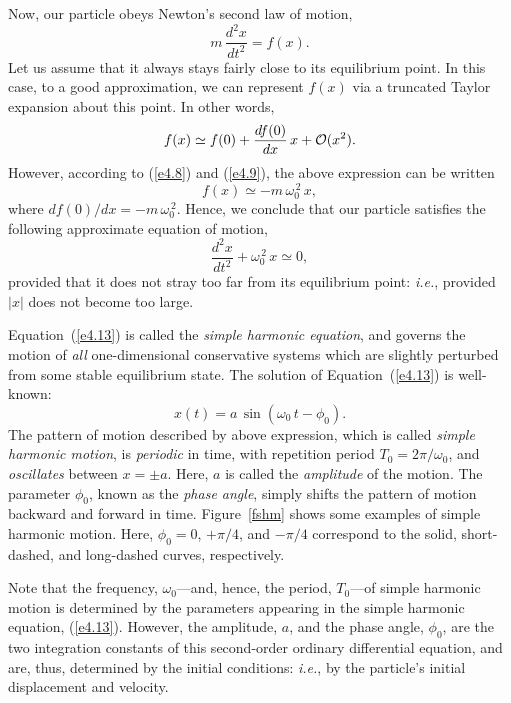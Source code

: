Now, our particle obeys Newton's second law of motion,
\begin{equation}
m\,\frac{d^2 x}{d t^2} = f(x).
\end{equation}
Let us assume that it always stays fairly close to its equilibrium
point. In this case, to a good approximation, we can represent $f(x)$
via a truncated Taylor expansion about this point. In other words,
\begin{equation}
f(x) \simeq f(0) + \frac{df(0)}{dx}\,x + {\cal O}(x^2).
\end{equation}
However, according to (\ref{e4.8}) and (\ref{e4.9}), the above
expression can be written
\begin{equation}\label{e4.12a}
f(x) \simeq - m\,\omega_0^{\,2}\,x,
\end{equation}
where $df(0)/dx = -m\,\omega_0^{\,2}$. 
Hence, we conclude that our particle satisfies the following approximate
equation of motion,
\begin{equation}\label{e4.13}
\frac{d^2 x}{dt^2}+ \omega_0^{\,2}\,x\simeq 0,
\end{equation}
provided that it does not stray too far from its equilibrium point: {\em i.e.},
provided $|x|$ does not become too large.

Equation~(\ref{e4.13}) is called the {\em simple harmonic equation}, and
governs the motion of {\em all}\/ one-dimensional conservative systems which are slightly
perturbed from some stable equilibrium state. The solution of Equation~(\ref{e4.13})
is well-known:
\begin{equation}\label{e4.12}
x(t) = a\,\sin(\omega_0\,t -\phi_0).
\end{equation}
The pattern of motion described by above expression, 
which is called {\em simple harmonic motion},
is {\em periodic}\/ in time, with repetition period
$T_0 = 2\pi/\omega_0$, and {\em oscillates}\/ between $x=\pm a$. Here, $a$
is called the {\em amplitude}\/ of the motion. The parameter $\phi_0$,
known as the {\em phase angle}, 
simply shifts the pattern of motion backward and forward in time. 
Figure~\ref{fshm} shows some examples of simple harmonic motion.
Here, $\phi_0 = 0$, $+\pi/4$, and $-\pi/4$ correspond to the
solid, short-dashed, and long-dashed curves, respectively.

Note that the frequency, $\omega_0$---and, hence, the period, $T_0$---of
simple harmonic motion is determined by the parameters appearing in the simple harmonic equation,
(\ref{e4.13}). However, the amplitude, $a$, and the phase angle, $\phi_0$,
are the two integration constants  of this second-order ordinary differential
equation, and are, thus, determined by the initial conditions: {\em i.e.}, by the particle's initial displacement and velocity.

